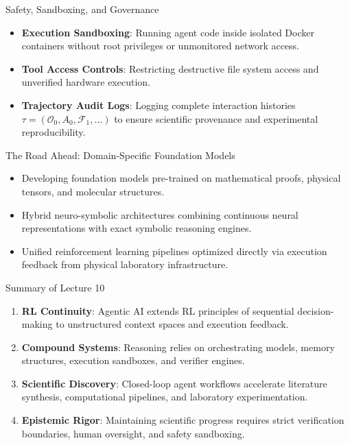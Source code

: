 \documentclass[10pt, aspectratio=169]{beamer}
\begin{document}
\begin{frame}{Safety, Sandboxing, and Governance}
  \begin{itemize}
    \item \textbf{Execution Sandboxing}: Running agent code inside isolated Docker containers without root privileges or unmonitored network access.
    \item \textbf{Tool Access Controls}: Restricting destructive file system access and unverified hardware execution.
    \item \textbf{Trajectory Audit Logs}: Logging complete interaction histories $\tau = (\mathcal{O}_0, A_0, \mathcal{F}_1, \dots)$ to ensure scientific provenance and experimental reproducibility.
  \end{itemize}
\end{frame}

\begin{frame}{The Road Ahead: Domain-Specific Foundation Models}
  \begin{itemize}
    \item Developing foundation models pre-trained on mathematical proofs, physical tensors, and molecular structures.
    \item Hybrid neuro-symbolic architectures combining continuous neural representations with exact symbolic reasoning engines.
    \item Unified reinforcement learning pipelines optimized directly via execution feedback from physical laboratory infrastructure.
  \end{itemize}
\end{frame}

\begin{frame}{Summary of Lecture 10}
  \begin{enumerate}
    \item \textbf{RL Continuity}: Agentic AI extends RL principles of sequential decision-making to unstructured context spaces and execution feedback.
    \item \textbf{Compound Systems}: Reasoning relies on orchestrating models, memory structures, execution sandboxes, and verifier engines.
    \item \textbf{Scientific Discovery}: Closed-loop agent workflows accelerate literature synthesis, computational pipelines, and laboratory experimentation.
    \item \textbf{Epistemic Rigor}: Maintaining scientific progress requires strict verification boundaries, human oversight, and safety sandboxing.
  \end{enumerate}
\end{frame}
\end{document}
